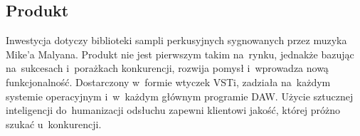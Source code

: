\documentclass[12pt]{article}
\begin{document}





\subsection{Produkt}


Inwestycja dotyczy biblioteki sampli perkusyjnych sygnowanych przez muzyka Mike'a Malyana.
Produkt nie jest pierwszym takim na~rynku, jednakże bazując na~sukcesach i~porażkach konkurencji, rozwija pomysł i~wprowadza nową funkcjonalność.
Dostarczony w~formie wtyczek VSTi, zadziała na~każdym systemie operacyjnym i~w~każdym głównym programie DAW.
Użycie sztucznej inteligencji do~humanizacji odsłuchu zapewni klientowi jakość, której próżno szukać u~konkurencji.
\end{document}

